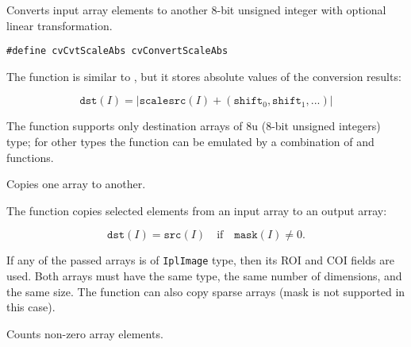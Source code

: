 Converts input array elements to another 8-bit unsigned integer with optional linear transformation.


\begin{lstlisting}
#define cvCvtScaleAbs cvConvertScaleAbs
\end{lstlisting}

\begin{description}
\end{description}


The function is similar to , but it stores absolute values of the conversion results:

\[
\texttt{dst}(I) = |\texttt{scale} \texttt{src}(I) + (\texttt{shift}_0,\texttt{shift}_1,...)|
\]

The function supports only destination arrays of 8u (8-bit unsigned integers) type; for other types the function can be emulated by a combination of  and  functions.

Copies one array to another.


\begin{description}
\end{description}


The function copies selected elements from an input array to an output array:

\[
\texttt{dst}(I)=\texttt{src}(I) \quad \text{if} \quad \texttt{mask}(I) \ne 0.
\]

If any of the passed arrays is of \texttt{IplImage} type, then its ROI
and COI fields are used. Both arrays must have the same type, the same
number of dimensions, and the same size. The function can also copy sparse
arrays (mask is not supported in this case).

Counts non-zero array elements.

